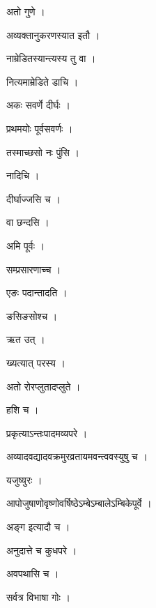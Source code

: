 \documentclass[10pt, openany]{book}
\begin{document}
\noindent अतो गुणे ।

\noindent अव्यक्तानुकरणस्यात इतौ ।

\noindent नाम्रेडितस्यान्त्यस्य तु वा ।

\noindent नित्यमाम्रेडिते डाचि ।

\noindent अकः सवर्णे दीर्घः ।

\noindent प्रथमयोः पूर्वसवर्णः ।

\noindent तस्माच्छसो नः पुंसि ।

\noindent नादिचि ।

\noindent दीर्घाज्जसि च ।

\noindent वा छन्दसि ।

\noindent अमि पूर्वः ।

\noindent सम्प्रसारणाच्च ।

\noindent एङः पदान्तादति ।

\noindent ङसिङसोश्च ।

\noindent ऋत उत् ।

\noindent ख्यत्यात् परस्य ।

\noindent अतो रोरप्लुतादप्लुते ।

\noindent हशि च ।

\noindent प्रकृत्याऽन्तःपादमव्यपरे ।

\noindent अव्यादवद्यादवक्रमुरव्रतायमवन्त्ववस्युषु च ।

\noindent यजुष्युरः ।

\noindent आपोजुषाणोवृष्णोवर्षिष्ठेऽम्बेऽम्बालेऽम्बिकेपूर्वे ।

\noindent अङ्ग इत्यादौ च ।

\noindent अनुदात्ते च कुधपरे ।

\noindent अवपथासि च ।

\noindent सर्वत्र विभाषा गोः ।
\end{document}

